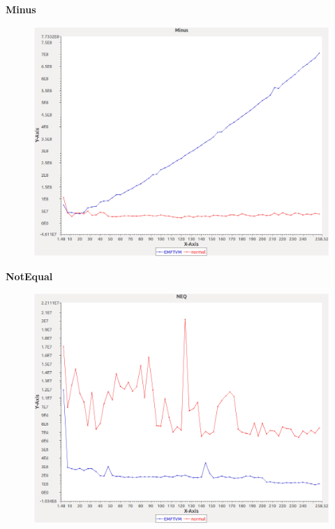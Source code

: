 \noindent\textbf{Minus}

\begin{figure}[h]
\centering
\includegraphics[width=\textwidth]{graphs/set/Minus}
\end{figure}
\pagebreak

\noindent\textbf{NotEqual}

\begin{figure}[h]
\centering
\includegraphics[width=\textwidth]{graphs/set/NEQ}
\end{figure}
\pagebreak

